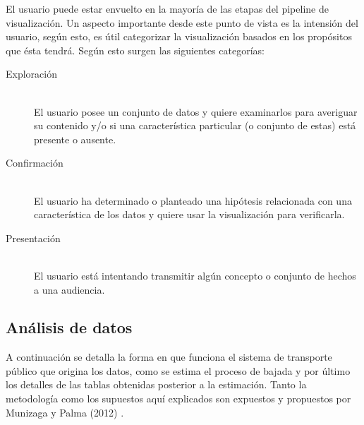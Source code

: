 \documentclass[12pt]{article}
\begin{document}
El usuario puede estar envuelto en la mayoría de las etapas del pipeline de visualización. Un aspecto importante desde este punto de vista es la intensión del usuario, según esto, es útil categorizar la visualización basados en los propósitos que ésta tendrá. Según esto surgen las siguientes categorías:

\begin{description}
	\item[Exploración] \hfill \\
El usuario posee un conjunto de datos y quiere examinarlos para averiguar su contenido y/o si una característica particular (o conjunto de estas) está presente o ausente.

	\item[Confirmación] \hfill \\
El usuario ha determinado o planteado una hipótesis relacionada con una característica de los datos y quiere usar la visualización para verificarla.

	\item[Presentación] \hfill \\
El usuario está intentando transmitir algún concepto o conjunto de hechos a una audiencia.
\end{description}


    
    
    \newpage
    \subsection{Análisis de datos}\label{sec:Analisis_datos}

	A continuación se detalla la forma en que funciona el sistema de transporte público que origina los datos, como se estima el proceso de bajada y por último los detalles de las tablas obtenidas posterior a la estimación. Tanto la metodología como los supuestos aquí explicados son expuestos y propuestos por Munizaga y Palma (2012) \cite{Procesamiento_datos}.
	
\end{document}

